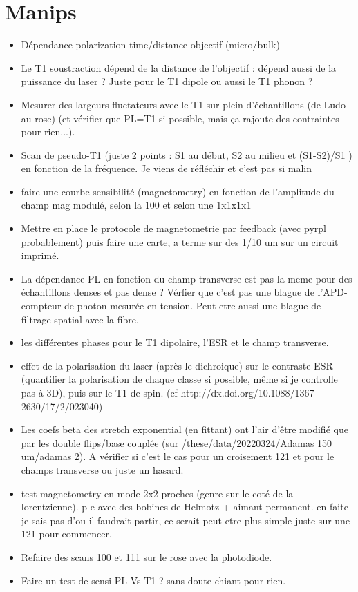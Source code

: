 \documentclass[a4paper]{report}
\begin{document}
 \section{Manips}
 \begin{itemize}
 \item Dépendance polarization time/distance objectif (micro/bulk)
 \item Le T1 soustraction dépend de la distance de l'objectif : dépend aussi de la puissance du laser ? Juste pour le T1 dipole ou aussi le T1 phonon ?
 \item Mesurer des largeurs fluctateurs avec le T1 sur plein d'échantillons (de Ludo au rose) (et vérifier que PL=T1 si possible, mais ça rajoute des contraintes pour rien...).
 \item Scan de pseudo-T1 (juste 2 points : S1 au début, S2 au milieu et (S1-S2)/S1 ) en fonction de la fréquence. Je viens de réfléchir et c'est pas si malin
 \item faire une courbe sensibilité (magnetometry) en fonction de l'amplitude du champ mag modulé, selon la 100 et selon une 1x1x1x1
 \item Mettre en place le protocole de magnetometrie par feedback (avec pyrpl probablement) puis faire une carte, a terme sur des 1/10 um sur un circuit imprimé.
 \item La dépendance PL en fonction du champ transverse est pas la meme pour des échantillons denses et pas dense ? Vérfier que c'est pas une blague de l'APD-compteur-de-photon mesurée en tension. Peut-etre aussi une blague de filtrage spatial avec la fibre.
 \item les différentes phases pour le T1 dipolaire, l'ESR et le champ transverse.
 \item effet de la polarisation du laser (après le dichroique) sur le contraste ESR (quantifier la polarisation de chaque classe si possible, même si je controlle pas à 3D), puis sur le T1 de spin. (cf http://dx.doi.org/10.1088/1367-2630/17/2/023040)
 \item Les coefs beta des stretch exponential (en fittant) ont l'air d'être modifié que par les double flips/base couplée (sur /these/data/20220324/Adamas 150 um/adamas 2). A vérifier si c'est le cas pour un croisement 121 et pour le champs transverse ou juste un hasard. 
 \item test magnetometry en mode 2x2 proches (genre sur le coté de la lorentzienne). p-e avec des bobines de Helmotz + aimant permanent. en faite je sais pas d'ou il faudrait partir, ce serait peut-etre plus simple juste sur une 121 pour commencer.
 \item Refaire des scans 100 et 111 sur le rose avec la photodiode.
 \item Faire un test de sensi PL Vs T1 ? sans doute chiant pour rien.
 \end{itemize}
 
\end{document}
